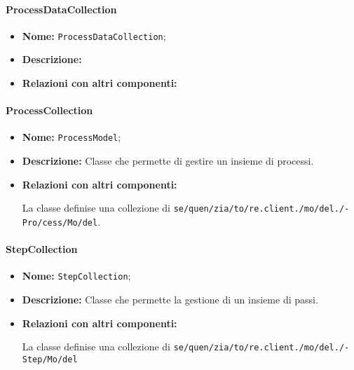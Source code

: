 \paragraph{ProcessDataCollection}
\begin{itemize}
\item \textbf{Nome:} \texttt{ProcessDataCollection};
\item \textbf{Descrizione:} 
\item \textbf{Relazioni con altri componenti:}
\begin{sloppypar}
\end{sloppypar}
\end{itemize}

\paragraph{ProcessCollection}
\begin{flushleft}
\begin{itemize}
\item \textbf{Nome:} \texttt{ProcessModel};
\item \textbf{Descrizione:} Classe che permette di gestire un insieme di processi.
\item \textbf{Relazioni con altri componenti:}
\begin{sloppypar}
La classe definise una collezione di \texttt{se\fshyp{}quen\fshyp{}zia\fshyp{}to\fshyp{}re.client.\fshyp{}mo\fshyp{}del.\fshyp{}Pro\fshyp{}cess\fshyp{}Mo\fshyp{}del}.
\end{sloppypar}
\end{itemize}
\end{flushleft}

\paragraph{StepCollection}
\begin{itemize}
\item \textbf{Nome:} \texttt{StepCollection};
\item \textbf{Descrizione:} Classe che permette la gestione di un insieme di passi.
\item \textbf{Relazioni con altri componenti:}
\begin{sloppypar}
La classe definise una collezione di \texttt{se\fshyp{}quen\fshyp{}zia\fshyp{}to\fshyp{}re.client.\fshyp{}mo\fshyp{}del.\fshyp{}Step\fshyp{}Mo\fshyp{}del}
\end{sloppypar}
\end{itemize}

